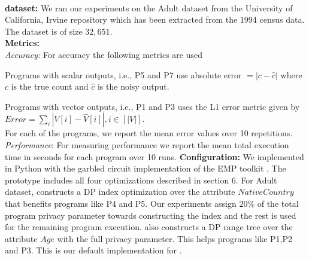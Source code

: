 \\\textbf{dataset:}
We ran our experiments on the Adult dataset from the University of California, Irvine repository \cite{UCI}  which has been extracted from the 1994 census data. The dataset is of size $32,651$.
\\\textbf{Metrics:}
\\\textit{Accuracy:} For accuracy the following metrics are used
\squishlist \item Programs with scalar outputs, i.e.,  P5 and P7 use absolute error $ =|c-\hat{c}|$ where $c$ is the true count and $\hat{c}$ is the noisy output.\item Programs with vector outputs, i.e., P1 and P3 uses the L1 error metric given  by $Error=\sum_{i}|V[i]-\hat{V}[i]|, i \in [|V|]$.\\
For each of the programs, we report the mean error values over 10 repetitions.\squishend
\textit{Performance}: For measuring performance we report the mean total execution time in seconds for each program over 10 runs. \textbf{Configuration:} We implemented \system in Python with the garbled circuit implementation of  the EMP
toolkit \cite{EMP}. The prototype  includes all four 
optimizations described in section 6.
For Adult dataset, \system constructs a DP index optimization over
the attribute $NativeCountry$ that benefits programs like P4 and P5. Our experiments assign
20\% of the total program privacy parameter towards constructing the index
and the rest is used for the remaining program execution. \system also constructs a
DP range tree over the attribute $Age$ with the full privacy parameter. This helps programs like P1,P2 and P3. This is our default implementation for \system. %



